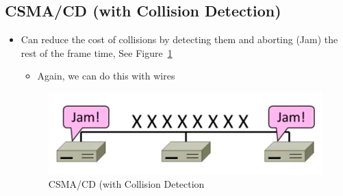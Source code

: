 \documentclass[12pt]{ctexart}   %
\begin{document}
	\subsection{CSMA/CD (with Collision Detection)}
	\begin{itemize}
		\item Can reduce the cost of collisions by detecting them and aborting (Jam) the rest of the frame time, See Figure~\ref{fig:3-4-4}
		\begin{itemize}
			\item Again, we can do this with wires
		\end{itemize}
		
		\begin{figure}[h!] %
		\centering
		 \includegraphics[scale=0.7]{images/3-4-4}
		\caption{ CSMA/CD (with Collision Detection }
		 \label{fig:3-4-4}
		 \end{figure}
	\end{itemize}
	
\end{document}
